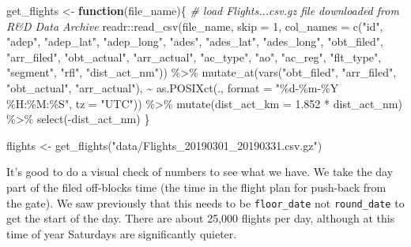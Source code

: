 \documentclass[
]{book}
\newenvironment{Shaded}{\begin{snugshade}}{\end{snugshade}}
\newcommand{\AttributeTok}[1]{\textcolor[rgb]{0.77,0.63,0.00}{#1}}
\newcommand{\CommentTok}[1]{\textcolor[rgb]{0.56,0.35,0.01}{\textit{#1}}}
\newcommand{\ControlFlowTok}[1]{\textcolor[rgb]{0.13,0.29,0.53}{\textbf{#1}}}
\newcommand{\DecValTok}[1]{\textcolor[rgb]{0.00,0.00,0.81}{#1}}
\newcommand{\FloatTok}[1]{\textcolor[rgb]{0.00,0.00,0.81}{#1}}
\newcommand{\FunctionTok}[1]{\textcolor[rgb]{0.00,0.00,0.00}{#1}}
\newcommand{\NormalTok}[1]{#1}
\newcommand{\OtherTok}[1]{\textcolor[rgb]{0.56,0.35,0.01}{#1}}
\newcommand{\SpecialCharTok}[1]{\textcolor[rgb]{0.00,0.00,0.00}{#1}}
\newcommand{\StringTok}[1]{\textcolor[rgb]{0.31,0.60,0.02}{#1}}
\begin{document}
\begin{Shaded}
\begin{Highlighting}[]
\NormalTok{get\_flights }\OtherTok{\textless{}{-}} \ControlFlowTok{function}\NormalTok{(file\_name)\{}
  \CommentTok{\# load Flights...csv.gz file downloaded from R\&D Data Archive}
\NormalTok{  readr}\SpecialCharTok{::}\FunctionTok{read\_csv}\NormalTok{(file\_name, }\AttributeTok{skip =} \DecValTok{1}\NormalTok{, }
                  \AttributeTok{col\_names =} \FunctionTok{c}\NormalTok{(}\StringTok{"id"}\NormalTok{, }\StringTok{"adep"}\NormalTok{, }\StringTok{"adep\_lat"}\NormalTok{, }\StringTok{"adep\_long"}\NormalTok{, }
                                \StringTok{"ades"}\NormalTok{, }\StringTok{"ades\_lat"}\NormalTok{, }\StringTok{"ades\_long"}\NormalTok{, }
                                \StringTok{"obt\_filed"}\NormalTok{, }\StringTok{"arr\_filed"}\NormalTok{, }\StringTok{"obt\_actual"}\NormalTok{, }\StringTok{"arr\_actual"}\NormalTok{,}
                                \StringTok{"ac\_type"}\NormalTok{, }\StringTok{"ao"}\NormalTok{, }\StringTok{"ac\_reg"}\NormalTok{, }
                                \StringTok{"flt\_type"}\NormalTok{, }\StringTok{"segment"}\NormalTok{, }\StringTok{"rfl"}\NormalTok{, }\StringTok{"dist\_act\_nm"}\NormalTok{)) }\SpecialCharTok{\%\textgreater{}\%} 
    \FunctionTok{mutate\_at}\NormalTok{(}\FunctionTok{vars}\NormalTok{(}\StringTok{"obt\_filed"}\NormalTok{, }\StringTok{"arr\_filed"}\NormalTok{, }\StringTok{"obt\_actual"}\NormalTok{, }\StringTok{"arr\_actual"}\NormalTok{), }
              \SpecialCharTok{\textasciitilde{}} \FunctionTok{as.POSIXct}\NormalTok{(., }\AttributeTok{format =} \StringTok{"\%d{-}\%m{-}\%Y \%H:\%M:\%S"}\NormalTok{, }\AttributeTok{tz =} \StringTok{"UTC"}\NormalTok{)) }\SpecialCharTok{\%\textgreater{}\%} 
    \FunctionTok{mutate}\NormalTok{(}\AttributeTok{dist\_act\_km =} \FloatTok{1.852} \SpecialCharTok{*}\NormalTok{ dist\_act\_nm) }\SpecialCharTok{\%\textgreater{}\%} 
    \FunctionTok{select}\NormalTok{(}\SpecialCharTok{{-}}\NormalTok{dist\_act\_nm)}
\NormalTok{\}}

\NormalTok{flights }\OtherTok{\textless{}{-}} \FunctionTok{get\_flights}\NormalTok{(}\StringTok{"data/Flights\_20190301\_20190331.csv.gz"}\NormalTok{)}
\end{Highlighting}
\end{Shaded}

It's good to do a visual check of numbers to see what we have. We take the day part of the filed off-blocks time (the time in the flight plan for push-back from the gate). We saw previously that this needs to be \texttt{floor\_date} not \texttt{round\_date} to get the start of the day. There are about 25,000 flights per day, although at this time of year Saturdays are significantly quieter.
\end{document}
